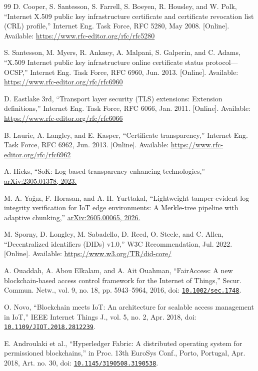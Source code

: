\documentclass[a4paper,5p,times,twocolumn,number,sort&compress]{elsarticle}
\begin{document}
\begin{thebibliography}{99}
 D. Cooper, S. Santesson, S. Farrell, S. Boeyen, R. Housley, and W. Polk, ``Internet X.509 public key infrastructure certificate and certificate revocation list (CRL) profile,'' Internet Eng. Task Force, RFC 5280, May 2008. [Online]. Available: \url{https://www.rfc-editor.org/rfc/rfc5280}

 S. Santesson, M. Myers, R. Ankney, A. Malpani, S. Galperin, and C. Adams, ``X.509 Internet public key infrastructure online certificate status protocol---OCSP,'' Internet Eng. Task Force, RFC 6960, Jun. 2013. [Online]. Available: \url{https://www.rfc-editor.org/rfc/rfc6960}

 D. Eastlake 3rd, ``Transport layer security (TLS) extensions: Extension definitions,'' Internet Eng. Task Force, RFC 6066, Jan. 2011. [Online]. Available: \url{https://www.rfc-editor.org/rfc/rfc6066}

 B. Laurie, A. Langley, and E. Kasper, ``Certificate transparency,'' Internet Eng. Task Force, RFC 6962, Jun. 2013. [Online]. Available: \url{https://www.rfc-editor.org/rfc/rfc6962}

 A. Hicks, ``SoK: Log based transparency enhancing technologies,'' \href{https://arxiv.org/abs/2305.01378}{arXiv:2305.01378, 2023.}

 M. A. Ya\u{g}\i{}z, F. Horasan, and A. H. Yurttakal, ``Lightweight tamper-evident log integrity verification for IoT edge environments: A Merkle-tree pipeline with adaptive chunking,'' \href{https://arxiv.org/abs/2605.00065}{arXiv:2605.00065, 2026.}

 M. Sporny, D. Longley, M. Sabadello, D. Reed, O. Steele, and C. Allen, ``Decentralized identifiers (DIDs) v1.0,'' W3C Recommendation, Jul. 2022. [Online]. Available: \url{https://www.w3.org/TR/did-core/}

 A. Ouaddah, A. Abou Elkalam, and A. Ait Ouahman, ``FairAccess: A new blockchain-based access control framework for the Internet of Things,'' Secur. Commun. Netw., vol. 9, no. 18, pp. 5943--5964, 2016, doi: \href{https://doi.org/10.1002/sec.1748}{\nolinkurl{10.1002/sec.1748}}.

 O. Novo, ``Blockchain meets IoT: An architecture for scalable access management in IoT,'' IEEE Internet Things J., vol. 5, no. 2, Apr. 2018, doi: \href{https://doi.org/10.1109/JIOT.2018.2812239}{\nolinkurl{10.1109/JIOT.2018.2812239}}.

 E. Androulaki et al., ``Hyperledger Fabric: A distributed operating system for permissioned blockchains,'' in Proc. 13th EuroSys Conf., Porto, Portugal, Apr. 2018, Art. no. 30, doi: \href{https://doi.org/10.1145/3190508.3190538}{\nolinkurl{10.1145/3190508.3190538}}.


\end{thebibliography}
\end{document}
